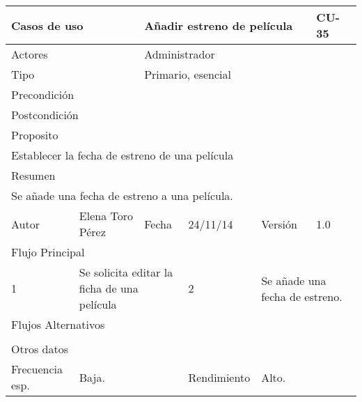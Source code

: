 \documentclass{article}
\begin{document}






\begin{table}[h]
\begin{tabular}{|l|l|l|l|l|l|}
\hline
\multicolumn{2}{|p{2cm}|}{Casos de uso}  & \multicolumn{3}{p{7cm}|}{Añadir estreno de película} & CU-35 \\
\hline
\multicolumn{2}{|p{2cm}|}{Actores}       & \multicolumn{4}{p{8cm}|}{Administrador}        \\
\hline
\multicolumn{2}{|p{2cm}|}{Tipo}          & \multicolumn{4}{p{8cm}|}{Primario, esencial}        \\
\hline
\multicolumn{2}{|p{2cm}|}{Precondición}  & \multicolumn{4}{p{8cm}|}{}        \\
\hline
\multicolumn{2}{|p{2cm}|}{Postcondición} & \multicolumn{4}{p{8cm}|}{}        \\
\hline
\multicolumn{6}{|p{10cm}|}{Proposito}                                   \\
\hline
\multicolumn{6}{|p{10cm}|}{Establecer la fecha de estreno de una película}                                            \\
\hline
\multicolumn{6}{|p{10cm}|}{Resumen}                                 \\
\hline
\multicolumn{6}{|p{10cm}|}{Se añade una fecha de estreno a una película.}                                            \\
\hline
Autor         &       Elena Toro Pérez       &  Fecha   &  24/11/14   &   Versión  & 1.0\\
\hline
\multicolumn{6}{|p{10cm}|}{Flujo Principal}\\
\hline
\multicolumn{1}{|p{1cm}|}{1} & \multicolumn{2}{p{3cm}}{Se solicita editar la ficha de una película} & \multicolumn{1}{|p{1cm}|}{2} & \multicolumn{2}{p{3cm}|}{Se añade una fecha de estreno.}\\
\hline
\multicolumn{6}{|p{10cm}|}{Flujos Alternativos}\\
\hline
\multicolumn{1}{|p{1cm}}{} & \multicolumn{5}{|p{9cm}|}{}\\
\hline
\multicolumn{6}{|p{10cm}|}{Otros datos}\\
\hline
\multicolumn{1}{|p{2cm}|}{Frecuencia esp.} & \multicolumn{2}{p{3cm}}{Baja.} & \multicolumn{1}{|p{2cm}|}{Rendimiento} & \multicolumn{2}{p{3cm}|}{Alto.}\\

\end{tabular}
\end{table}
\end{document}

